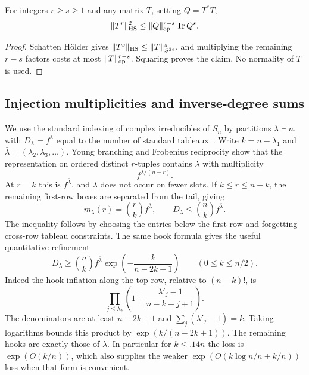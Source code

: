 \begin{lemma}\label{lem:schatten}
For integers $r\ge s\ge1$ and any matrix $T$, setting $Q=T^*T$,
\[
 \|T^r\|_{\mathrm{HS}}^2\le\|Q\|_{\mathrm{op}}^{r-s}\operatorname{Tr} Q^s.
\]
\end{lemma}
\begin{proof}
Schatten H\"older gives $\|T^s\|_{\mathrm{HS}}\le\|T\|_{S^{2s}}^s$, and multiplying the remaining $r-s$ factors costs at most $\|T\|_{\mathrm{op}}^{r-s}$. Squaring proves the claim. No normality of $T$ is used.
\end{proof}

\subsection{Injection multiplicities and inverse-degree sums}
We use the standard indexing of complex irreducibles of $S_n$ by partitions $\lambda\vdash n$, with $D_\lambda=f^\lambda$ equal to the number of standard tableaux~\cite{Sagan2001,Stanley1999}. Write $k=n-\lambda_1$ and $\bar\lambda=(\lambda_2,\lambda_3,\ldots)$. Young branching and Frobenius reciprocity show that the representation on ordered distinct $r$-tuples contains $\lambda$ with multiplicity
\[
 f^{\lambda/(n-r)}.
\]
At $r=k$ this is $f^{\bar\lambda}$, and $\lambda$ does not occur on fewer slots. If $k\le r\le n-k$, the remaining first-row boxes are separated from the tail, giving
\begin{equation}\label{eq:tuplemultiplicity}
 m_\lambda(r)=\binom rk f^{\bar\lambda},\qquad
 D_\lambda\le\binom nk f^{\bar\lambda}.
\end{equation}
The inequality follows by choosing the entries below the first row and forgetting cross-row tableau constraints.
The same hook formula gives the useful quantitative refinement
\begin{equation}\label{eq:near-row-hooks}
 D_\lambda\ge\binom nk f^{\bar\lambda}
       \exp\left(-\frac{k}{n-2k+1}\right)
 \qquad(0\le k\le n/2).
\end{equation}
Indeed the hook inflation along the top row, relative to $(n-k)!$, is
\[
 \prod_{j\le\lambda_2}\left(1+
   \frac{\lambda'_j-1}{n-k-j+1}\right).
\]
The denominators are at least $n-2k+1$ and
$\sum_j(\lambda'_j-1)=k$. Taking logarithms bounds this product by
$\exp(k/(n-2k+1))$. The remaining hooks are exactly those of
$\bar\lambda$. In particular for $k\le.14n$ the loss is $\exp(O(k/n))$,
which also supplies the weaker $\exp(O(k\log n/n+k/n))$ loss when that
form is convenient.

